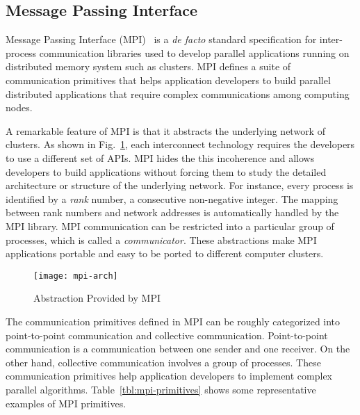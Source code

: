 \subsection{Message Passing Interface}\label{sec:i-mpi}

Message Passing Interface (MPI)~\autocite{MPIForum2012} is a \emph{de
facto} standard specification for inter-process communication libraries
used to develop parallel applications running on distributed memory system
such as clusters. MPI defines a suite of communication primitives that helps
application developers to build parallel distributed applications that require
complex communications among computing nodes.

A remarkable feature of MPI is that it abstracts the underlying network
of clusters. As shown in Fig.~\ref{fig:mpi-arch}, each interconnect technology
requires the developers to use a different set of APIs. MPI hides the this
incoherence and allows developers to build applications without forcing them
to study the detailed architecture or structure of the underlying network. For
instance, every process is identified by a \emph{rank} number, a consecutive
non-negative integer. The mapping between rank numbers and network addresses
is automatically handled by the MPI library. MPI communication can be
restricted into a particular group of processes, which is called a
\emph{communicator}. These abstractions make MPI applications portable and
easy to be ported to different computer clusters.

\begin{figure}
    \centering
    \texttt{[image: mpi-arch]}
    \caption{Abstraction Provided by MPI}%
    \label{fig:mpi-arch}
\end{figure}

The communication primitives defined in MPI can be roughly categorized into
point-to-point communication and collective communication. Point-to-point
communication is a communication between one sender and one receiver. On the
other hand, collective communication involves a group of processes. These
communication primitives help application developers to implement complex
parallel algorithms. Table~\ref{tbl:mpi-primitives} shows some representative
examples of MPI primitives.

